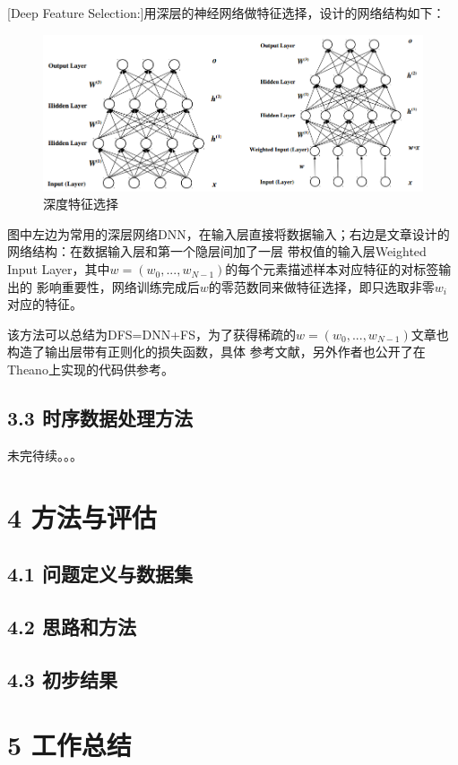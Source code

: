\documentclass[a4paper,UTF8]{article}
\begin{document}
[Deep Feature Selection:]用深层的神经网络做特征选择，设计的网络结构如下：

\begin{figure}[!htbp]
  \centering
  \includegraphics[scale=0.4]{DFS.png}
  \caption{深度特征选择}
\end{figure}
图中左边为常用的深层网络DNN，在输入层直接将数据输入；右边是文章设计的网络结构：在数据输入层和第一个隐层间加了一层
带权值的输入层Weighted Input Layer，其中$w=(w_{0},...,w_{N-1})$的每个元素描述样本对应特征的对标签输出的
影响重要性，网络训练完成后$w$的零范数同来做特征选择，即只选取非零$w_{i}$对应的特征。

该方法可以总结为DFS=DNN+FS，为了获得稀疏的$w=(w_{0},...,w_{N-1})$文章也构造了输出层带有正则化的损失函数，具体
参考文献，另外作者也公开了在Theano上实现的代码供参考。\cite{wiki}


\subsection*{3.3 时序数据处理方法}

未完待续。。。



\section*{4 方法与评估}

\subsection*{4.1 问题定义与数据集}

\subsection*{4.2 思路和方法}

\subsection*{4.3 初步结果}



\section*{5 工作总结}
















\end{document}
